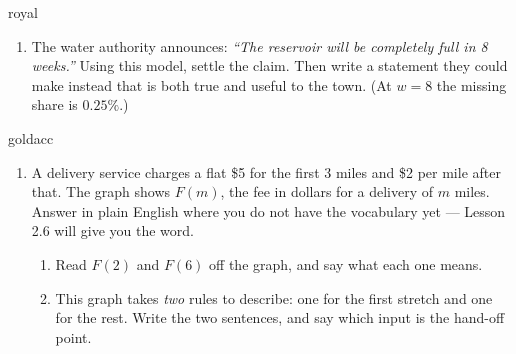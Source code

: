 \documentclass[10pt]{article}
\begin{document}
\begin{scenariobox}{royal}
\begin{enumerate}[leftmargin=1.6em, itemsep=6pt, topsep=2pt, start=6]

\item The water authority announces: \emph{``The reservoir will be completely full in 8 weeks.''}
Using this model, settle the claim. Then write a statement they could make instead that is both true
and useful to the town. (At $w=8$ the missing share is $0.25\%$.)


\end{enumerate}
\end{scenariobox}

\vspace{0.10in}

\boxguard[24]
\begin{scenariobox}{goldacc}
\small
\begin{enumerate}[leftmargin=1.6em, itemsep=6pt, topsep=2pt, start=10]

\item A delivery service charges a flat \$5 for the first $3$ miles and \$2 per mile after that. The
graph shows $F(m)$, the fee in dollars for a delivery of $m$ miles. Answer in plain English where you
do not have the vocabulary yet --- Lesson 2.6 will give you the word.

\begin{center}
\end{center}

\begin{enumerate}[label=(\alph*), leftmargin=1.6em, itemsep=5pt, topsep=4pt]
  \item Read $F(2)$ and $F(6)$ off the graph, and say what each one means.


  \item This graph takes \emph{two} rules to describe: one for the first stretch and one for the
        rest. Write the two sentences, and say which input is the hand-off point.


\end{enumerate}
\end{enumerate}
\end{scenariobox}
\end{document}
